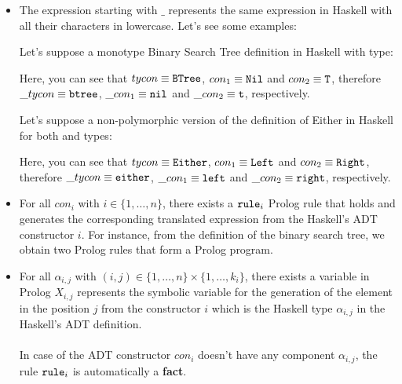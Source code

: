 \begin{itemize}
	\item The expression starting with $\_$ represents the same expression in Haskell with all their characters in lowercase. Let's see some examples:\\
	      	      	      	      	      	      	      
	      \begin{example}
	      	Let's suppose a monotype Binary Search Tree definition in Haskell with  type:
	      	
	      	Here, you can see that $tycon \equiv \texttt{BTree}$, $con_1 \equiv \texttt{Nil}$ and $con_2 \equiv \texttt{T}$, therefore $\_tycon \equiv \texttt{btree}$, $\_con_1 \equiv \texttt{nil}$ and $\_con_2 \equiv \texttt{t}$, respectively.\\
	      \end{example}
	      \begin{example}
	      	Let's suppose a non-polymorphic version of the definition of Either in Haskell for both  and  types:
	      	
	      	Here, you can see that $tycon \equiv \texttt{Either}$, $con_1 \equiv \texttt{Left}$ and $con_2 \equiv \texttt{Right}$, therefore $\_tycon \equiv \texttt{either}$, $\_con_1 \equiv \texttt{left}$ and $\_con_2 \equiv \texttt{right}$, respectively.
	      \end{example}
	      	      	      	      	      	      
	\item For all $con_i$ with $i \in \{1, \ldots, n \}$, there exists a $\texttt{rule}_i$ Prolog rule that holds and generates the corresponding translated expression from the Haskell's ADT constructor $i$. For instance, from the definition of the binary search tree, we obtain two Prolog rules that form a Prolog program.
	\item For all $\alpha_{i,j}$ with $(i,j) \in \{1, \ldots, n \} \times \{1, \ldots, k_i \}$, there exists a variable in Prolog $X_{i,j}$ represents the symbolic variable for the generation of the element in the position $j$ from the constructor $i$ which is the Haskell type $\alpha_{i,j}$ in the Haskell's ADT definition.\\\\
	      In case of the ADT constructor $con_i$ doesn't have any component $\alpha_{i,j}$, the rule $\texttt{rule}_i$ is automatically a \textbf{fact}.
	      	      	      	      	      

\end{itemize}

